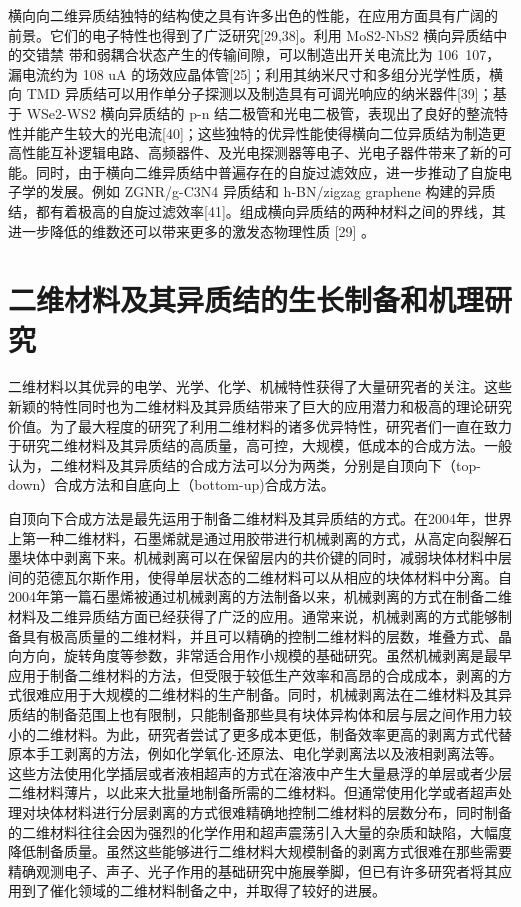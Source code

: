 横向向二维异质结独特的结构使之具有许多出色的性能，在应用方面具有广阔的
前景。它们的电子特性也得到了广泛研究[29,38]。利用 MoS2-NbS2 横向异质结中的交错禁
带和弱耦合状态产生的传输间隙，可以制造出开关电流比为 106~107，漏电流约为 108
uA 的场效应晶体管[25]；利用其纳米尺寸和多组分光学性质，横向 TMD 异质结可以用作单分子探测以及制造具有可调光响应的纳米器件[39]；基于 WSe2-WS2 横向异质结的 p-n 结二极管和光电二极管，表现出了良好的整流特性并能产生较大的光电流[40]；这些独特的优异性能使得横向二位异质结为制造更高性能互补逻辑电路、高频器件、及光电探测器等电子、光电子器件带来了新的可能。同时，由于横向二维异质结中普遍存在的自旋过滤效应，进一步推动了自旋电子学的发展。例如 ZGNR/g-C3N4 异质结和 h-BN/zigzag graphene 构建的异质结，都有着极高的自旋过滤效率[41]。组成横向异质结的两种材料之间的界线，其进一步降低的维数还可以带来更多的激发态物理性质 [29] 。

\section{二维材料及其异质结的生长制备和机理研究}
二维材料以其优异的电学、光学、化学、机械特性获得了大量研究者的关注。这些新颖的特性同时也为二维材料及其异质结带来了巨大的应用潜力和极高的理论研究价值。为了最大程度的研究了利用二维材料的诸多优异特性，研究者们一直在致力于研究二维材料及其异质结的高质量，高可控，大规模，低成本的合成方法。一般认为，二维材料及其异质结的合成方法可以分为两类，分别是自顶向下（top-down）合成方法和自底向上（bottom-up)合成方法。

自顶向下合成方法是最先运用于制备二维材料及其异质结的方式。在2004年，世界上第一种二维材料，石墨烯就是通过用胶带进行机械剥离的方式，从高定向裂解石墨块体中剥离下来。机械剥离可以在保留层内的共价键的同时，减弱块体材料中层间的范德瓦尔斯作用，使得单层状态的二维材料可以从相应的块体材料中分离。自2004年第一篇石墨烯被通过机械剥离的方法制备以来，机械剥离的方式在制备二维材料及二维异质结方面已经获得了广泛的应用。通常来说，机械剥离的方式能够制备具有极高质量的二维材料，并且可以精确的控制二维材料的层数，堆叠方式、晶向方向，旋转角度等参数，非常适合用作小规模的基础研究。虽然机械剥离是最早应用于制备二维材料的方法，但受限于较低生产效率和高昂的合成成本，剥离的方式很难应用于大规模的二维材料的生产制备。同时，机械剥离法在二维材料及其异质结的制备范围上也有限制，只能制备那些具有块体异构体和层与层之间作用力较小的二维材料。为此，研究者尝试了更多成本更低，制备效率更高的剥离方式代替原本手工剥离的方法，例如化学氧化-还原法、电化学剥离法以及液相剥离法等。这些方法使用化学插层或者液相超声的方式在溶液中产生大量悬浮的单层或者少层二维材料薄片，以此来大批量地制备所需的二维材料。但通常使用化学或者超声处理对块体材料进行分层剥离的方式很难精确地控制二维材料的层数分布，同时制备的二维材料往往会因为强烈的化学作用和超声震荡引入大量的杂质和缺陷，大幅度降低制备质量。虽然这些能够进行二维材料大规模制备的剥离方式很难在那些需要精确观测电子、声子、光子作用的基础研究中施展拳脚，但已有许多研究者将其应用到了催化领域的二维材料制备之中，并取得了较好的进展。

